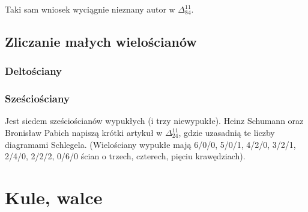 Taki sam wniosek wyciągnie nieznany autor w $\Delta_{84}^{11}$.


\subsection{Zliczanie małych wielościanów}
\subsubsection{Deltościany}

\subsubsection{Sześciościany}
Jest siedem sześciościanów wypukłych (i trzy niewypukłe).
Heinz Schumann oraz Bronisław Pabich napiszą krótki artykuł w $\Delta_{24}^{11}$, gdzie uzasadnią te liczby diagramami Schlegela.
%
(Wielościany wypukłe mają 6/0/0, 5/0/1, 4/2/0, 3/2/1, 2/4/0, 2/2/2, 0/6/0 ścian o trzech, czterech, pięciu krawędziach).

\section{Kule, walce}
